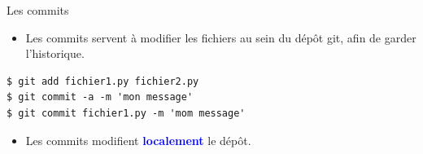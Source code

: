 \documentclass[presentation]{beamer}
\begin{document}
\begin{frame}[fragile]{Les commits}
\begin{itemize}
\item Les commits servent à modifier les fichiers au sein du dépôt git, afin de garder l'historique.
\end{itemize}
\begin{lstlisting}
$ git add fichier1.py fichier2.py
$ git commit -a -m 'mon message'
$ git commit fichier1.py -m 'mom message'
\end{lstlisting}

\pause
\begin{itemize}
\item Les commits modifient \textbf{\textcolor{blue}{localement}} le dépôt.
\end{itemize}
\begin{figure}%
\end{figure}
\end{frame}
\end{document}

